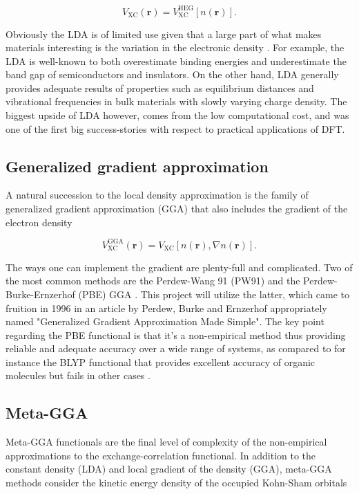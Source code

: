 \begin{equation}
V_\text{XC}(\boldsymbol{r}) = V_\text{XC} ^\text{HEG}[n(\boldsymbol{r})] .
\end{equation} 

Obviously the LDA is of limited use given that a large part of what makes materials interesting is the variation in the electronic density \cite{Sholl2009}. For example, the LDA is well-known to both overestimate binding energies and underestimate the band gap of semiconductors and insulators. On the other hand, LDA generally provides adequate results of properties such as equilibrium distances and vibrational frequencies in bulk materials with slowly varying charge density. The biggest upside of LDA however, comes from the low computational cost, and was one of the first big success-stories with respect to practical applications of DFT. 


\subsection{Generalized gradient approximation}
A natural succession to the local density approximation is the family of generalized gradient approximation (GGA) that also includes the gradient of the electron density

\begin{equation}
V_\text{XC} ^\text{GGA} (\boldsymbol{r}) = V_\text{XC} [n(\boldsymbol{r}), \nabla n(\boldsymbol{r})].
\end{equation}

The ways one can implement the gradient are plenty-full and complicated. Two of the most common methods are the Perdew-Wang 91 (PW91) \cite{pw91} and the Perdew-Burke-Ernzerhof (PBE) GGA \cite{pbe}. This project will utilize the latter, which came to fruition in  1996 in an article by Perdew, Burke and Ernzerhof appropriately named "Generalized Gradient Approximation Made Simple". The key point regarding the PBE functional is that it's a non-empirical method thus providing reliable and adequate accuracy over a wide range of systems, as compared to for instance the BLYP functional that provides excellent accuracy of organic molecules but fails in other cases \cite{PBE_forum}. 

\subsection{Meta-GGA}   
Meta-GGA functionals are the final level of complexity of the non-empirical approximations to the exchange-correlation functional. In addition to the constant density (LDA) and local gradient of the density (GGA), meta-GGA methods consider the kinetic energy density of the occupied Kohn-Sham orbitals \cite{metagga}
 
